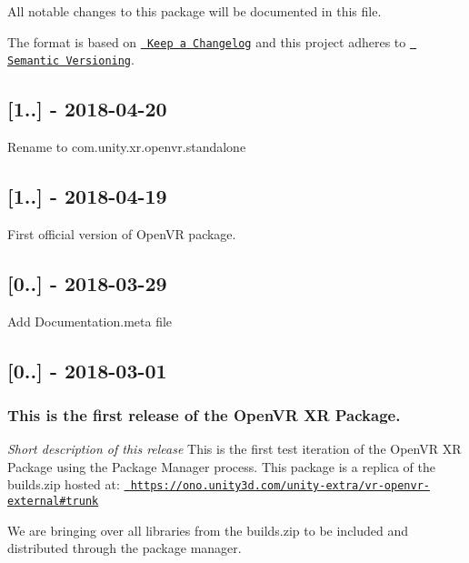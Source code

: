 All notable changes to this package will be documented in this file.

The format is based on \href{http://keepachangelog.com/en/1.0.0/}{\texttt{ Keep a Changelog}} and this project adheres to \href{http://semver.org/spec/v2.0.0.html}{\texttt{ Semantic Versioning}}.

\subsection*{\mbox{[}1..\mbox{]} -\/ 2018-\/04-\/20}

Rename to com.\+unity.\+xr.\+openvr.\+standalone

\subsection*{\mbox{[}1..\mbox{]} -\/ 2018-\/04-\/19}

First official version of Open\+VR package.

\subsection*{\mbox{[}0..\mbox{]} -\/ 2018-\/03-\/29}

Add Documentation.\+meta file

\subsection*{\mbox{[}0..\mbox{]} -\/ 2018-\/03-\/01}

\subsubsection*{This is the first release of the Open\+VR XR Package.}

{\itshape Short description of this release} This is the first test iteration of the Open\+VR XR Package using the Package Manager process. This package is a replica of the builds.\+zip hosted at\+: \href{https://ono.unity3d.com/unity-extra/vr-openvr-external\#trunk}{\texttt{ https\+://ono.\+unity3d.\+com/unity-\/extra/vr-\/openvr-\/external\#trunk}}

We are bringing over all libraries from the builds.\+zip to be included and distributed through the package manager. 